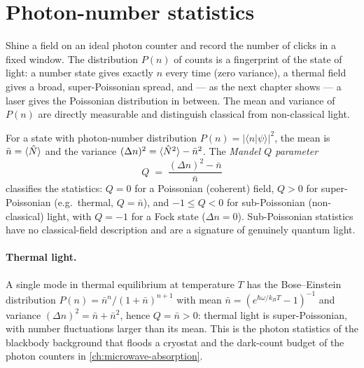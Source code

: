 \section{Photon-number statistics}
\label{sec:photon-statistics}

\begin{phenomenon}
Shine a field on an ideal photon counter and record the number of
clicks in a fixed window. The distribution $P(n)$ of counts is a
fingerprint of the state of light: a number state gives exactly $n$
every time (zero variance), a thermal field gives a broad,
super-Poissonian spread, and --- as the next chapter shows --- a
laser gives the Poissonian distribution in between. The mean and
variance of $P(n)$ are directly measurable and distinguish
classical from non-classical light.
\end{phenomenon}

\begin{statement}
\label{stmt:mandel}
For a state with photon-number distribution $P(n)=|\langle n|\psi\rangle|^2$,
the mean is $\bar n=\langle\hat{N}\rangle$ and the variance
$(\Delta n)^2=\langle\hat{N}^2\rangle-\bar n^2$. The \emph{Mandel
$Q$ parameter}
\begin{equation}
\label{eq:mandel-Q}
Q \;=\; \frac{(\Delta n)^2 - \bar n}{\bar n}
\end{equation}
classifies the statistics: $Q=0$ for a Poissonian (coherent) field,
$Q>0$ for super-Poissonian (e.g.\ thermal, $Q=\bar n$), and
$-1\leq Q<0$ for sub-Poissonian (non-classical) light, with $Q=-1$
for a Fock state ($\Delta n=0$). Sub-Poissonian statistics have no
classical-field description and are a signature of genuinely quantum
light.
\end{statement}

\paragraph{Thermal light.}
A single mode in thermal equilibrium at temperature $T$ has the
Bose--Einstein distribution
$P(n)=\bar n^n/(1+\bar n)^{n+1}$ with mean
$\bar n=(e^{\hbar\omega/k_BT}-1)^{-1}$ and variance
$(\Delta n)^2=\bar n+\bar n^2$, hence $Q=\bar n>0$:
thermal light is super-Poissonian, with number fluctuations larger
than its mean. This is the photon statistics of the blackbody
background that floods a cryostat and the dark-count budget of the
photon counters in \cref{ch:microwave-absorption}.

